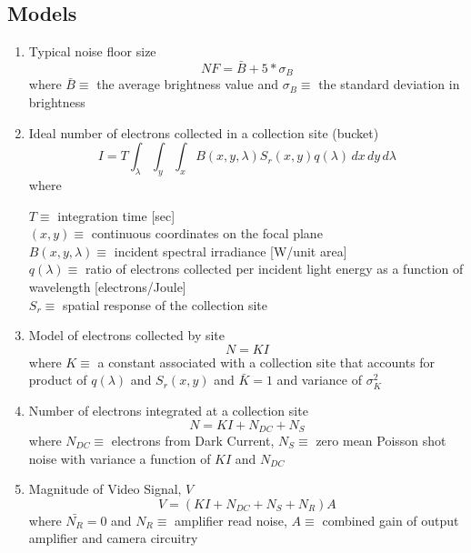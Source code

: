 \subsection{Models}
\begin{enumerate}
    \item Typical noise floor size\cite{accuracy_performance_of_star_trackers} 
    \[ NF = \bar{B} + 5*\sigma_{B} \]
    where $\bar{B} \equiv$ the average brightness value and $\sigma_{B} \equiv$ the standard deviation in brightness

    \item Ideal number of electrons collected in a collection site (bucket)\cite{radiometric_ccd_camera_calibration}
    \[ I = T\int_{\lambda}\int_{y}\int_{x} B(x,y,\lambda)S_{r}(x,y)q(\lambda) \,dx \,dy \,d\lambda \]
    where \\
    \begin{center}
        $ T \equiv$ integration time [sec]\\
        $(x,y) \equiv$ continuous coordinates on the focal plane\\
        $B(x,y,\lambda) \equiv$ incident spectral irradiance [W/unit area]\\
        $q(\lambda) \equiv$ ratio of electrons collected per incident light energy as a function of wavelength [electrons/Joule]\\
        $S_{r} \equiv$ spatial response of the collection site  
    \end{center}

    \item Model of electrons collected by site\cite{radiometric_ccd_camera_calibration}
    \[ N = KI \]
    where $K \equiv$ a constant associated with a collection site that accounts for product of $q(\lambda)$ and $S_{r}(x,y)$ and $\bar{K} = 1$ and variance of $\sigma^{2}_{K}$

    \item Number of electrons integrated at a collection site\cite{radiometric_ccd_camera_calibration} 
    \[ N = KI + N_{DC} + N_{S} \]
    where $N_{DC} \equiv$ electrons from Dark Current, $N_{S} \equiv$ zero mean Poisson shot noise with variance a function of $KI$ and $N_{DC}$
    
    \item Magnitude of Video Signal, $V$\cite{radiometric_ccd_camera_calibration}
    \[ V = (KI + N_{DC} + N_{S} + N_{R})A \]
    where $\bar{N_{R}} = 0$ and $N_{R} \equiv$ amplifier read noise, $A \equiv$ combined gain of output amplifier and camera circuitry 


\end{enumerate}
